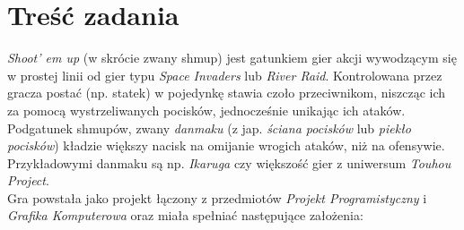 \newpage
\part{\huge \textbf{Treść zadania}}
	\indent \indent \textit{Shoot' em up} (w skrócie zwany shmup) jest gatunkiem gier akcji wywodzącym się w prostej linii od gier typu \textit{Space Invaders} lub \textit{River Raid}. Kontrolowana przez gracza postać (np. statek) w pojedynkę stawia czoło przeciwnikom, niszcząc ich za pomocą wystrzeliwanych pocisków, jednocześnie unikając ich ataków. Podgatunek shmupów, zwany \textit{danmaku} (z jap. \textit{ściana pocisków} lub \textit{piekło pocisków}) kładzie większy nacisk na omijanie wrogich ataków, niż na ofensywie. Przykładowymi danmaku są np. \textit{Ikaruga} czy większość gier z uniwersum \textit{Touhou Project}. \\

	Gra powstała jako projekt łączony z przedmiotów \textit{Projekt Programistyczny} i \textit{Grafika Komputerowa} oraz miała spełniać następujące założenia:
	
